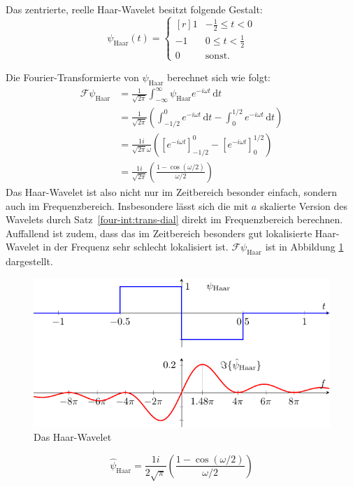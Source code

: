 \begin{definition}
	\label{complex:def-haar-wavelet}
	Das zentrierte, reelle Haar-Wavelet besitzt folgende Gestalt:
	\[
	\psi_{\text{Haar}}(t) = \left\lbrace\begin{matrix*}[r]
	1 & -\frac{1}{2} \le t < 0  \\
	-1 & 0 \le t < \frac{1}{2} \\
	0 & \text{sonst}.
	\end{matrix*} \right.\label{complex:def-haar}
	\]
\end{definition}
Die Fourier-Transformierte von $\psi_{\text{Haar}}$ berechnet sich wie folgt:
\begin{align}
	\mathcal F \psi_\text{Haar}  
	&= \frac{1}{\sqrt{2\pi}}\int_{-\infty}^{\infty} \psi_\text{Haar} e^{-i\omega t} \,\mathrm{d}t\nonumber\\
	&= \frac{1}{\sqrt{2\pi}}\left( \int_{-1/2}^{0} e^{-i\omega t} \,\mathrm{d}t - \int_{0}^{1/2} e^{-i\omega t}\,\mathrm{d}t \right) \nonumber\\
	&= \frac{1i}{\sqrt{2\pi}\omega}\left( \left[ e^{-i\omega t}\right]_{-1/2}^0  - \left[ e^{-i\omega t}\right]_{0}^{1/2} \right)\nonumber\\
	&= \frac{1i}{\sqrt{2\pi}}\left( \frac{1-\cos(\omega/2)}{\omega/2}\right)\label{complex:f-psi-haar}
\end{align}
Das Haar-Wavelet ist also nicht nur im Zeitbereich besonder einfach, sondern auch im Frequenzbereich.
Insbesondere lässt sich die mit $a$ skalierte Version des Wavelets durch Satz~\ref{four-int:trans-dial} direkt im Frequenzbereich berechnen.
Auffallend ist zudem, dass das im Zeitbereich besonders gut lokalisierte Haar-Wavelet in der Frequenz sehr schlecht lokalisiert ist.
$\mathcal{F}\psi_\text{Haar}$ ist in Abbildung \ref{complex:haar} dargestellt.
\begin{figure}
	\centering
	\includegraphics{papers/complex/images/haar.pdf}
	\caption{Das Haar-Wavelet}
	\label{complex:haar}
\end{figure}
\[\hat{\psi}_\text{Haar} = \frac{1i}{2\sqrt{\pi}}\left( \frac{1-\cos(\omega/2)}{\omega/2}\right) \]

